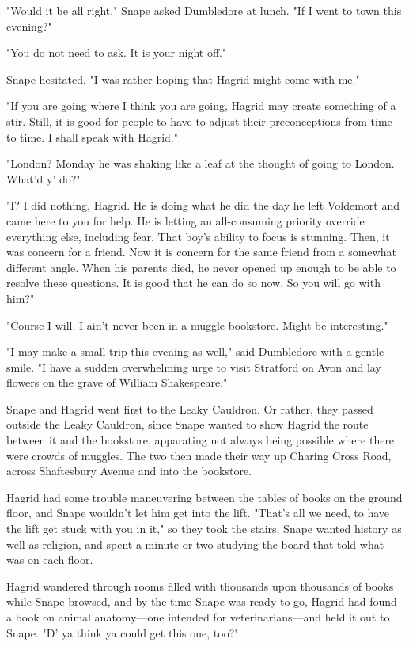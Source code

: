"Would it be all right," Snape asked Dumbledore at lunch. "If I went to town this evening?"

"You do not need to ask. It is your night off."

Snape hesitated. "I was rather hoping that Hagrid might come with me."

"If you are going where I think you are going, Hagrid may create something of a stir. Still, it is good for people to have to adjust their preconceptions from time to time. I shall speak with Hagrid."

"London? Monday he was shaking like a leaf at the thought of going to London. What'd y' do?"

"I? I did nothing, Hagrid. He is doing what he did the day he left Voldemort and came here to you for help. He is letting an all-consuming priority override everything else, including fear. That boy's ability to focus is stunning. Then, it was concern for a friend. Now it is concern for the same friend from a somewhat different angle. When his parents died, he never opened up enough to be able to resolve these questions. It is good that he can do so now. So you will go with him?"

"Course I will. I ain't never been in a muggle bookstore. Might be interesting."

"I may make a small trip this evening as well," said Dumbledore with a gentle smile. "I have a sudden overwhelming urge to visit Stratford on Avon and lay flowers on the grave of William Shakespeare."

Snape and Hagrid went first to the Leaky Cauldron. Or rather, they passed outside the Leaky Cauldron, since Snape wanted to show Hagrid the route between it and the bookstore, apparating not always being possible where there were crowds of muggles. The two then made their way up Charing Cross Road, across Shaftesbury Avenue and into the bookstore.

Hagrid had some trouble maneuvering between the tables of books on the ground floor, and Snape wouldn't let him get into the lift. "That's all we need, to have the lift get stuck with you in it," so they took the stairs. Snape wanted history as well as religion, and spent a minute or two studying the board that told what was on each floor.

Hagrid wandered through rooms filled with thousands upon thousands of books while Snape browsed, and by the time Snape was ready to go, Hagrid had found a book on animal anatomy—one intended for veterinarians—and held it out to Snape. "D' ya think ya could get this one, too?"

